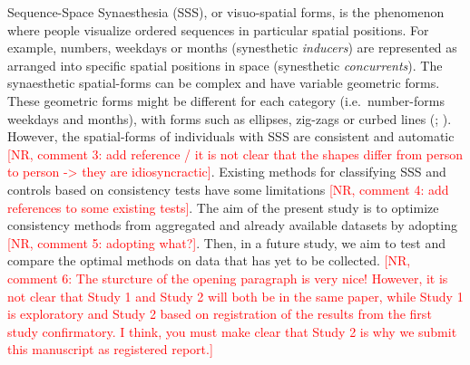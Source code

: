 \documentclass[
  man,
  longtable,
  a4paper,
  nolmodern,
  notxfonts,
  notimes,
  colorlinks=true,linkcolor=blue,citecolor=blue,urlcolor=blue]{apa7}
\begin{document}
Sequence-Space Synaesthesia (SSS), or visuo-spatial forms, is the
phenomenon where people visualize ordered sequences in particular
spatial positions. For example, numbers, weekdays or months (synesthetic
\emph{inducers}) are represented as arranged into specific spatial
positions in space (synesthetic \emph{concurrents}). The synaesthetic
spatial-forms can be complex and have variable geometric forms. These
geometric forms might be different for each category (i.e.~number-forms
weekdays and months), with forms such as ellipses, zig-zags or curbed
lines (;
). However, the spatial-forms of
individuals with SSS are consistent and automatic
\textcolor{red}{[NR, comment 3: add reference / it is not clear that the shapes differ from person to person -> they are idiosyncractic]}.
Existing methods for classifying SSS and controls based on consistency
tests have some limitations
\textcolor{red}{[NR, comment 4: add references to some existing tests]}.
The aim of the present study is to optimize consistency methods from
aggregated and already available datasets by adopting
\textcolor{red}{[NR, comment 5: adopting what?]}. Then, in a future
study, we aim to test and compare the optimal methods on data that has
yet to be collected.
\textcolor{red}{[NR, comment 6: The sturcture of the opening paragraph is very nice! However, it is not clear that Study 1 and Study 2 will both be in the same paper, while Study 1 is exploratory and Study 2 based on registration of the results from the first study confirmatory. I think, you must make clear that Study 2 is why we submit this manuscript as registered report.]}
\end{document}
